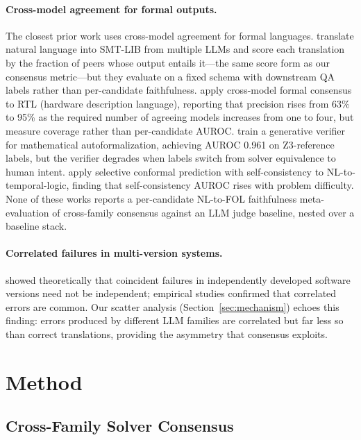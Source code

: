 \documentclass[11pt,letterpaper]{article}
\begin{document}
\paragraph{Cross-model agreement for formal outputs.}
The closest prior work uses cross-model agreement for formal languages.
\citet{Bayless2025} translate natural language into SMT-LIB from multiple LLMs and score each translation by the fraction of peers whose output entails it---the same score form as our consensus metric---but they evaluate on a fixed schema with downstream QA labels rather than per-candidate faithfulness.
\citet{Alvanaki2026} apply cross-model formal consensus to RTL (hardware description language), reporting that precision rises from 63\% to 95\% as the required number of agreeing models increases from one to four, but measure coverage rather than per-candidate AUROC.
\citet{Singh2026} train a generative verifier for mathematical autoformalization, achieving AUROC 0.961 on Z3-reference labels, but the verifier degrades when labels switch from solver equivalence to human intent.
\citet{Wang2026} apply selective conformal prediction with self-consistency to NL-to-temporal-logic, finding that self-consistency AUROC rises with problem difficulty.
None of these works reports a per-candidate NL-to-FOL faithfulness meta-evaluation of cross-family consensus against an LLM judge baseline, nested over a baseline stack.

\paragraph{Correlated failures in multi-version systems.}
\citet{Eckhardt1985} showed theoretically that coincident failures in independently developed software versions need not be independent; empirical studies confirmed that correlated errors are common.
Our scatter analysis (Section~\ref{sec:mechanism}) echoes this finding: errors produced by different LLM families are correlated but far less so than correct translations, providing the asymmetry that consensus exploits.

\section{Method}
\label{sec:method}

\subsection{Cross-Family Solver Consensus}
\label{sec:consensus_def}
\end{document}
